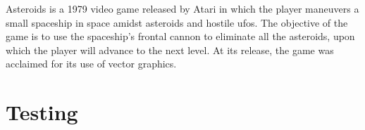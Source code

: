 Asteroids is a 1979 video game released by Atari in which the player maneuvers a small spaceship in space amidst asteroids and hostile ufos. The objective of the game is to use the spaceship's frontal cannon to eliminate all the asteroids, upon which the player will advance to the next level. At its release, the game was acclaimed for its use of vector graphics.



\section{Testing}
